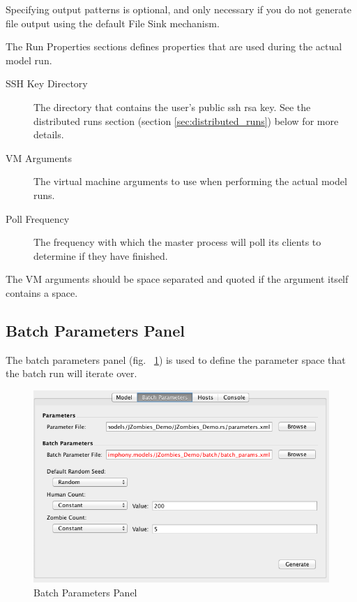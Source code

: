 \documentclass[11pt]{amsart}
\begin{document}
Specifying output patterns is optional, and only necessary if you do not generate file output using the default File Sink mechanism.

The Run Properties sections defines properties that are used during the actual model run.
\label{sec:run_props}
\begin{description}
\item[SSH Key Directory] The directory that contains the user's public ssh rsa key. See the distributed runs section (section \ref{sec:distributed_runs}) below for more details.
\item[VM Arguments] The virtual machine arguments to use when performing the actual model runs.
\item[Poll Frequency] The frequency with which the master process will poll its clients to determine if they have finished.
\end{description}

The VM arguments should be space separated and quoted if the argument itself contains a space.

\subsection{Batch Parameters Panel}
The batch parameters panel (fig. ~\ref{fig:batch_params})  is used to define the parameter space that the batch run will iterate over.

\begin{figure}[h]
\begin{center}
\vspace{.2in}
\centerline {
\includegraphics[width=6in]{images/batch_params_panel.png}
}
\caption{Batch Parameters Panel}
\label{fig:batch_params}
\end{center}
\end{figure}
\end{document}
